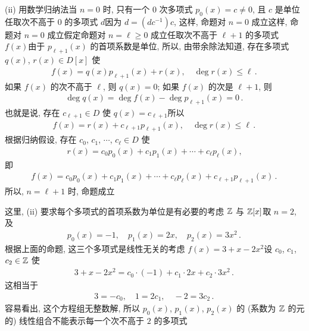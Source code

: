 \begin{pf}
    (ii) 用数学归纳法\period 当 $n=0$ 时, 只有一个 $0$ 次多项式 $p_0 (x) = c \neq 0$, 且 $c$ 是单位\period 任取次不高于 $0$ 的多项式 $d$\period 因为 $d = (dc^{-1})c$, 这样, 命题对 $n=0$ 成立\period 这样, 命题对 $n=0$ 成立\period 假定命题对 $n = \ell \geq 0$ 成立\period 任取次不高于 $\ell + 1$ 的多项式 $f(x)$\period 由于 $p_{\ell + 1} (x)$ 的首项系数是单位, 所以, 由带余除法知道, 存在多项式 $q(x)$, $r(x) \in D[x]$ 使
    \begin{align*}
        f(x) = q(x) p_{\ell + 1} (x) + r(x), \quad \deg r(x) \leq \ell \period
    \end{align*}
    如果 $f(x)$ 的次不高于 $\ell$, 则 $q(x) = 0$; 如果 $f(x)$ 的次是 $\ell + 1$, 则
    \begin{align*}
        \deg q(x) = \deg f(x) - \deg p_{\ell+1} (x) = 0 \period
    \end{align*}
    也就是说, 存在 $c_{\ell + 1} \in D$ 使 $q(x) = c_{\ell + 1}$\period 所以
    \begin{align*}
        f(x) = r(x) + c_{\ell + 1} p_{\ell + 1} (x), \quad \deg r(x) \leq \ell \period
    \end{align*}
    根据归纳假设, 存在 $c_0$, $c_1$, $\cdots$, $c_{\ell} \in D$ 使
    \begin{align*}
        r(x) = c_0 p_0 (x) + c_1 p_1 (x) + \cdots + c_{\ell} p_{\ell} (x),
    \end{align*}
    即
    \begin{align*}
        f(x) = c_0 p_0 (x) + c_1 p_1 (x) + \cdots + c_{\ell} p_{\ell} (x) + c_{\ell + 1} p_{\ell + 1} (x) \period
    \end{align*}
    所以, $n = \ell + 1$ 时, 命题成立\period
\end{pf}

\begin{remark}
    这里, (ii) 要求每个多项式的首项系数为单位是有必要的\period 考虑 $\mathbb{Z}$ 与 $\mathbb{Z}[x]$\period 取 $n=2$, 及
    \begin{align*}
        p_0 (x) = -1, \quad p_1 (x) = 2x, \quad p_2 (x) = 3x^2 \period
    \end{align*}
    根据上面的命题, 这三个多项式是线性无关的\period 考虑 $f(x) = 3 + x - 2x^2$\period 设 $c_0$, $c_1$, $c_2 \in \mathbb{Z}$ 使
    \begin{align*}
        3 + x - 2x^2 = c_0 \cdot (-1) + c_1 \cdot 2x + c_2 \cdot 3x^2 \period
    \end{align*}
    这相当于
    \begin{align*}
        3 = -c_0, \quad 1 = 2c_1, \quad -2 = 3c_2 \period
    \end{align*}
    容易看出, 这个方程组无整数解, 所以 $p_0 (x)$, $p_1 (x)$, $p_2 (x)$ 的 (系数为 $\mathbb{Z}$ 的元的) 线性组合不能表示每一个次不高于 $2$ 的多项式\period
\end{remark}

